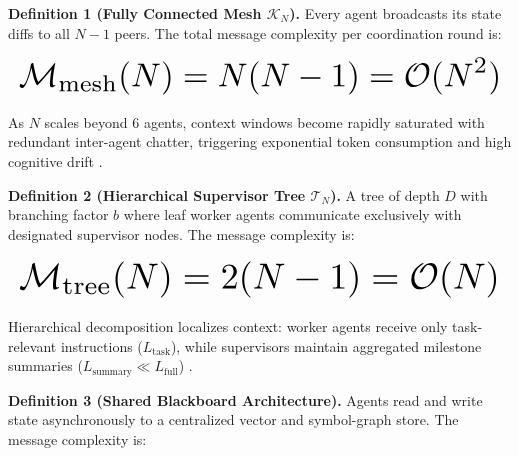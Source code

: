 \documentclass[10pt,twocolumn,letterpaper]{article}
\begin{document}
\textbf{Definition 1 (Fully Connected Mesh $\mathcal{K}_N$).} Every agent broadcasts its state diffs to all $N-1$ peers. The total message complexity per coordination round is:












\begin{equation}
\resizebox{\columnwidth}{!}{$\displaystyle
\begin{aligned}
\mathcal{M}_{\text{mesh}}(N) = N(N - 1) = \mathcal{O}(N^2)
\end{aligned}
$}
\end{equation}












As $N$ scales beyond 6 agents, context windows become rapidly saturated with redundant inter-agent chatter, triggering exponential token consumption and high cognitive drift \cite{arxiv_2412_06333}.

\textbf{Definition 2 (Hierarchical Supervisor Tree $\mathcal{T}_N$).} A tree of depth $D$ with branching factor $b$ where leaf worker agents communicate exclusively with designated supervisor nodes. The message complexity is:












\begin{equation}
\resizebox{\columnwidth}{!}{$\displaystyle
\begin{aligned}
\mathcal{M}_{\text{tree}}(N) = 2(N - 1) = \mathcal{O}(N)
\end{aligned}
$}
\end{equation}












Hierarchical decomposition localizes context: worker agents receive only task-relevant instructions ($L_{\text{task}}$), while supervisors maintain aggregated milestone summaries ($L_{\text{summary}} \ll L_{\text{full}}$) \cite{arxiv_2406_00584}.

\textbf{Definition 3 (Shared Blackboard Architecture).} Agents read and write state asynchronously to a centralized vector and symbol-graph store. The message complexity is:
\end{document}
